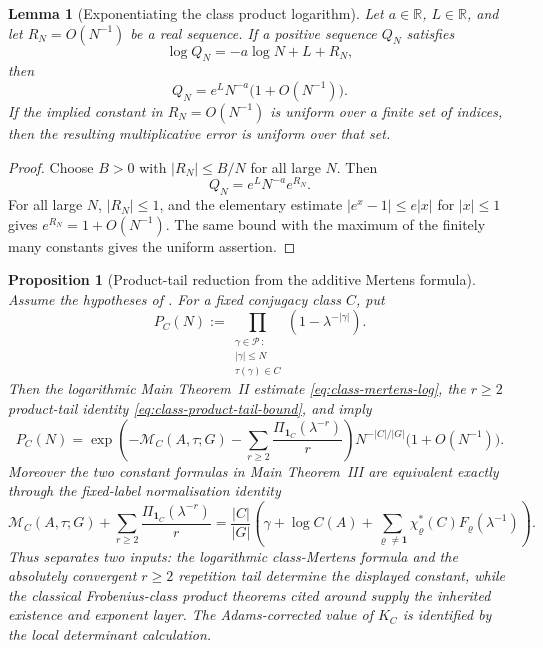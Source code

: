 \documentclass[11pt,a4paper]{amsart}
\theoremstyle{plain}
\newtheorem{proposition}[theorem]{Proposition}
\newtheorem{lemma}[theorem]{Lemma}
\theoremstyle{definition}
\theoremstyle{remark}
\newcommand{\RR}{\mathbb{R}}
\newcommand{\cP}{\mathcal P}
\begin{document}
\begin{lemma}[Exponentiating the class product logarithm]
  \label{lem:class-product-log-to-product-error}
  Let \(a\in\RR\), \(L\in\RR\), and let \(R_N=O(N^{-1})\) be a real sequence.
  If a positive sequence \(Q_N\) satisfies
  \[
    \log Q_N=-a\log N+L+R_N,
  \]
  then
  \[
    Q_N=e^L N^{-a}\bigl(1+O(N^{-1})\bigr).
  \]
  If the implied constant in \(R_N=O(N^{-1})\) is uniform over a finite set of
  indices, then the resulting multiplicative error is uniform over that set.
\end{lemma}

\begin{proof}
  Choose \(B>0\) with \(|R_N|\le B/N\) for all large \(N\).  Then
  \[
    Q_N=e^L N^{-a}e^{R_N}.
  \]
  For all large \(N\), \(|R_N|\le1\), and the elementary estimate
  \(|e^x-1|\le e|x|\) for \(|x|\le1\) gives
  \(e^{R_N}=1+O(N^{-1})\).  The same bound with the maximum of the finitely
  many constants gives the uniform assertion.
\end{proof}

\begin{proposition}[Product-tail reduction from the additive Mertens formula]
  \label{prop:class-euler-product-main-chain-reduction}
  Assume the hypotheses of .  For a fixed
  conjugacy class \(C\), put
  \[
    P_C(N):=
    \prod_{\substack{\gamma\in\cP\,:\\ |\gamma|\le N\\
      \tau(\gamma)\in C}}
      \left(1-\lambda^{-|\gamma|}\right).
  \]
  Then the logarithmic Main Theorem~II estimate
  \eqref{eq:class-mertens-log}, the \(r\ge2\) product-tail identity
  \eqref{eq:class-product-tail-bound}, and
   imply
  \begin{equation}\label{eq:class-euler-product-reduction-asymptotic}
    P_C(N)=
    \exp\!\left(
      -\mathcal M_C(A,\tau;G)
      -\sum_{r\ge2}\frac{\Pi_{\mathbf1_C}(\lambda^{-r})}{r}
    \right)
    N^{-|C|/|G|}\bigl(1+O(N^{-1})\bigr).
  \end{equation}
  Moreover the two constant formulas in Main Theorem~III are equivalent
  exactly through the fixed-label normalisation identity
  \begin{equation}\label{eq:class-euler-product-reduction-normalisation}
    \mathcal M_C(A,\tau;G)
    +\sum_{r\ge2}\frac{\Pi_{\mathbf1_C}(\lambda^{-r})}{r}
    =
    \frac{|C|}{|G|}
    \left(
      \gamma+
      \log C(A)+
      \sum_{\varrho\ne\mathbf1}
        \chi_\varrho^\ast(C)F_\varrho(\lambda^{-1})
    \right).
  \end{equation}
  Thus  separates two inputs: the
  logarithmic class-Mertens formula and the absolutely convergent
  \(r\ge2\) repetition tail determine the displayed constant, while the
  classical Frobenius-class product theorems cited around
   supply the inherited existence and
  exponent layer.  The Adams-corrected value of \(K_C\) is identified by the
  local determinant calculation.
\end{proposition}
\end{document}
